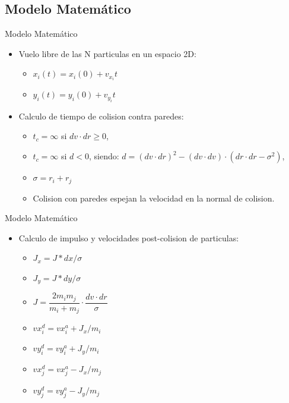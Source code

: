 \documentclass{beamer}
\begin{document}
\subsection{Modelo Matemático}
\begin{frame}{Modelo Matemático}
  \begin{itemize}
    \item Vuelo libre de las N particulas en un espacio 2D:
    \begin{itemize}
      \item $x_i(t) = x_i(0) + v_{x_i} t$
      \item $y_i(t) = y_i(0) + v_{y_i} t$
    \end{itemize}
    \item Calculo de tiempo de colision contra paredes:
    \begin{itemize}
      \item $t_{c} = \infty$ si $dv \cdot dr \geqslant 0$,
      \item $t_{c} = \infty$ si $d < 0$, siendo: $d = (dv \cdot dr)^2 - (dv \cdot dv)\cdot(dr \cdot dr - \sigma^2 )$,
      \item $\sigma = r_i + r_j$
      \item Colision con paredes espejan la velocidad en la normal de colision.
    \end{itemize}
  \end{itemize}
\end{frame}

\begin{frame}{Modelo Matemático}
  \begin{itemize}
    \item Calculo de impulso y velocidades post-colision de particulas:
      \begin{itemize}
        \item $J_x = J*dx/\sigma$
        \item $J_y = J*dy/\sigma$
        \item $J = \dfrac{2 m_i m_j}{m_i + m_j} \cdot \dfrac{dv \cdot dr}{\sigma}$
        \item $vx_i^d = vx_i^a + J_x/m_i$
        \item $vy_i^d = vy_i^a + J_y/m_i$
        \item $vx_j^d = vx_j^a - J_x/m_j$
        \item $vy_j^d = vy_j^a - J_y/m_j$
      \end{itemize}
  \end{itemize}
\end{frame}
\end{document}

